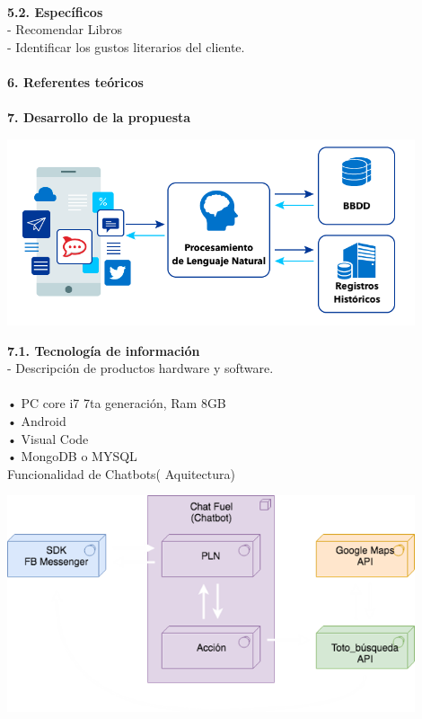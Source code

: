 \begin{flushleft}
\begin{itemize}
\textbf{ }\\

\textbf{5.2.   Específicos}\\

-	Recomendar Libros\\
-	Identificar los gustos literarios del cliente.\\



\textbf{ }\\

\textbf{6.      Referentes teóricos}\\
\textbf{ }\\
\textbf{7.      Desarrollo de la propuesta}\\

\begin{center}
	\includegraphics[width=12cm]{./Imagenes/nlp} 
	\end{center}
\textbf{7.1.   Tecnología de información}\\
-	Descripción de productos hardware y software.\\ 
\textbf{ }\\

•	PC core i7 7ta generación, Ram 8GB \\
•	Android \\
•	Visual Code\\
•	MongoDB o MYSQL\\
Funcionalidad de Chatbots( Aquitectura)
\begin{center}
	\includegraphics[width=12cm]{./Imagenes/api} 
	\end{center}


\end{itemize}
\end{flushleft}
